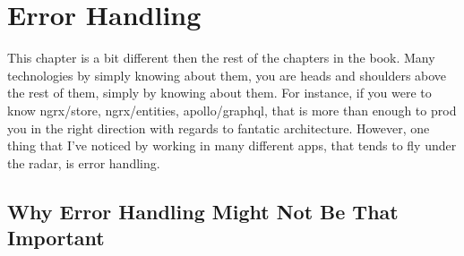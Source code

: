 \section{Error Handling}
\maketitle{}

This chapter is a bit different then the rest of the chapters in the book. Many
technologies by simply knowing about them, you are heads and shoulders above the
rest of them, simply by knowing about them. For instance, if you were to know
ngrx/store, ngrx/entities, apollo/graphql, that is more than enough to prod you
in the right direction with regards to fantatic architecture. However, one thing
that I've noticed by working in many different apps, that tends to fly under
the radar, is error handling.

\subsection{ Why Error Handling Might Not Be That Important }
